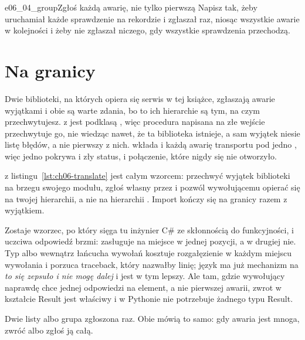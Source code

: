\begin{exercise}{e06_04_group}{Zgłoś każdą awarię, nie tylko pierwszą}
Napisz  tak, żeby uruchamiał każde sprawdzenie na rekordzie i
zgłaszał raz, niosąc wszystkie awarie w kolejności \dash{} i żeby nie zgłaszał
niczego, gdy wszystkie sprawdzenia przechodzą.
\end{exercise}

\section{Na granicy}
\label{sec:ch06-boundary}

Dwie biblioteki, na których opiera się serwis w tej książce, zgłaszają awarie
wyjątkami i obie są warte zdania, bo to ich hierarchie są tym, na czym
przechwytujesz.  z  jest podklasą
, więc procedura napisana na złe wejście przechwytuje go, nie
wiedząc nawet, że ta biblioteka istnieje, a sam wyjątek niesie listę błędów, a
nie pierwszy z nich.  wkłada  i każdą awarię
transportu pod jedno , więc jedno  pokrywa i zły
status, i połączenie, które nigdy się nie otworzyło.

 z listingu~\ref{lst:ch06-translate} jest całym wzorcem:
przechwyć wyjątek biblioteki na brzegu swojego modułu, zgłoś własny przez
 i pozwól wywołującemu opierać się na twojej hierarchii, a nie na
hierarchii . Import kończy się na granicy razem z wyjątkiem.

Zostaje wzorzec, po który sięga tu inżynier C\# ze skłonnością do
funkcyjności, i uczciwa odpowiedź brzmi: zasługuje na miejsce w jednej
pozycji, a w drugiej nie. Typ  albo  wewnątrz
łańcucha wywołań kosztuje rozgałęzienie w każdym miejscu wywołania i porzuca
traceback, który nazwałby linię; język ma już mechanizm na \emph{to się
zepsuło i nie mogę dalej} i jest w tym lepszy. Ale tam, gdzie wywołujący
naprawdę chce jednej odpowiedzi na element, a nie pierwszej awarii, zwrot w
kształcie Result jest właściwy \dash{} i w Pythonie nie potrzebuje żadnego
typu Result.


\noindent
Dwie listy albo grupa zgłoszona raz. Obie mówią to samo: gdy awaria jest
mnoga, zwróć albo zgłoś ją całą.

